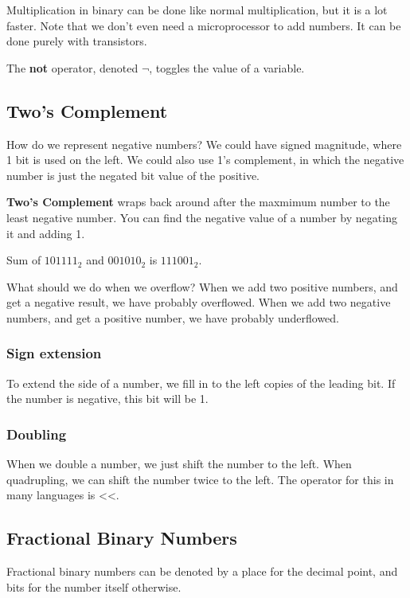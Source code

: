 
Multiplication in binary can be done like normal multiplication, but it is a lot faster. Note that we don't even need a microprocessor to add numbers. It can be done purely with transistors.

\begin{definition}
	The \textbf{not} operator, denoted \( \neg \), toggles the value of a variable.
\end{definition}

\subsection{Two's Complement}

How do we represent negative numbers? We could have signed magnitude, where 1 bit is used on the left. We could also use 1's complement, in which the negative number is just the negated bit value of the positive.

\begin{definition}
	\textbf{Two's Complement} wraps back around after the maxmimum number to the least negative number. You can find the negative value of a number by negating it and adding 1.
\end{definition}

\begin{eg}
	Sum of \( 101111_2 \) and \( 001010_2 \) is \( 111001_2 \).
\end{eg}

What should we do when we overflow? When we add two positive numbers, and get a negative result, we have probably overflowed. When we add two negative numbers, and get a positive number, we have probably underflowed.

\subsubsection{Sign extension}

To extend the side of a number, we fill in to the left copies of the leading bit. If the number is negative, this bit will be 1.

\subsubsection{Doubling}

When we double a number, we just shift the number to the left. When quadrupling, we can shift the number twice to the left. The operator for this in many languages is <<.

\subsection{Fractional Binary Numbers}

Fractional binary numbers can be denoted by a place for the decimal point, and bits for the number itself otherwise.
